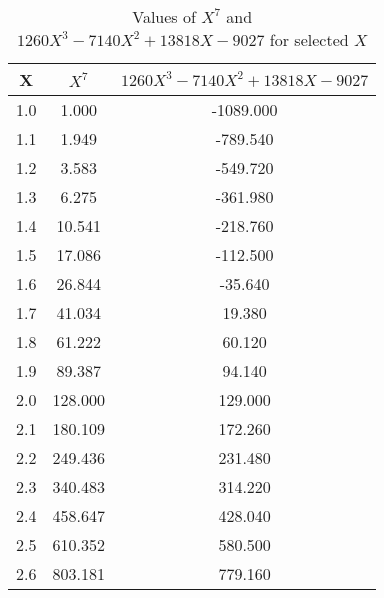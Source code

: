 ﻿%
\begin{table}[h!]
    \centering
    \caption{Values of $X^7$ and $1260X^3 - 7140X^2 + 13818X - 9027$ for selected $X$}
    \begin{tabular}{|c|c|c|}
        \hline
        \textbf{X} & \textbf{$X^7$} & \textbf{$1260X^3 - 7140X^2 + 13818X - 9027$} \\ \hline
        1.0        & 1.000          & -1089.000                                    \\ \hline
        1.1        & 1.949          & -789.540                                     \\ \hline
        1.2        & 3.583          & -549.720                                     \\ \hline
        1.3        & 6.275          & -361.980                                     \\ \hline
        1.4        & 10.541         & -218.760                                     \\ \hline
        1.5        & 17.086         & -112.500                                     \\ \hline
        1.6        & 26.844         & -35.640                                      \\ \hline
        1.7        & 41.034         & 19.380                                       \\ \hline
        1.8        & 61.222         & 60.120                                       \\ \hline
        1.9        & 89.387         & 94.140                                       \\ \hline
        2.0        & 128.000        & 129.000                                      \\ \hline
        2.1        & 180.109        & 172.260                                      \\ \hline
        2.2        & 249.436        & 231.480                                      \\ \hline
        2.3        & 340.483        & 314.220                                      \\ \hline
        2.4        & 458.647        & 428.040                                      \\ \hline
        2.5        & 610.352        & 580.500                                      \\ \hline
        2.6        & 803.181        & 779.160                                      \\ \hline

\end{tabular}
\end{table}
